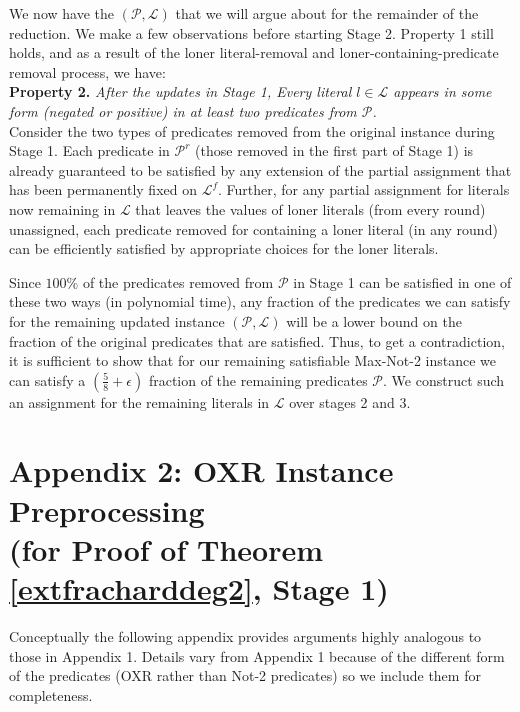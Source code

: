 \documentclass{article}
\begin{document}
We now have the $(\mathcal{P}, \mathcal{L})$ that we will argue about for the remainder of the reduction.  We make a few observations before starting Stage 2. Property 1 still holds, and as a result of the loner literal-removal and loner-containing-predicate removal process, we have:\\

\noindent \textbf{Property 2.} \textit{After the updates in Stage 1, Every literal $l\in \mathcal{L}$ appears in some form (negated or positive) in at least two predicates from $\mathcal{P}$.}\\

Consider the two types of predicates removed from the original instance during Stage 1.  Each predicate in $\mathcal{P}^r$ (those removed in the first part of Stage 1) is already guaranteed to be satisfied by any extension of the partial assignment that has been  permanently fixed on $\mathcal{L}^f$. Further, for any partial assignment for literals now remaining in $\mathcal{L}$ that leaves the values of loner literals (from every round) unassigned, 
each predicate removed for containing a loner literal (in any round) can be efficiently satisfied by appropriate choices for the loner literals. 

Since $100\%$ of the predicates removed from $\mathcal{P}$ in Stage 1 can be satisfied in one of these two ways (in polynomial time), any fraction of the predicates we can satisfy for the remaining updated instance $(\mathcal{P}, \mathcal{L})$ will be a lower bound on the fraction of the original predicates that are satisfied. Thus, to get a contradiction, it is sufficient to show that for our remaining satisfiable Max-Not-2 instance we can satisfy a $(\frac{5}{8}+\epsilon)$ fraction of the remaining predicates $\mathcal{P}$. We construct such an assignment for the remaining literals in $\mathcal{L}$ over stages 2 and 3.\\




\section{Appendix 2: OXR Instance Preprocessing \\(for Proof of Theorem \ref{extfracharddeg2}, Stage 1) }

Conceptually the following appendix provides arguments highly analogous to those in Appendix 1. Details vary from Appendix 1 because of the different form of the predicates (OXR rather than Not-2 predicates) so we include them for completeness.
\end{document}
